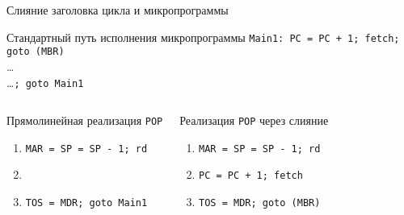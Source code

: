 \begin{frame}{Слияние заголовка цикла и микропрограммы}
\small
\pause
\begin{block}{Стандартный путь исполнения микропрограммы}
\pause
\texttt{Main1: PC = PC + 1; fetch; goto (MBR)}\\
\ldots\\
\ldots\texttt{; goto Main1}
\end{block}
\pause
\begin{columns}
    \column{5.5cm}
    \begin{block}{Прямолинейная реализация \texttt{POP}}
    \pause
    \begin{enumerate}
        \item \texttt{MAR = SP = SP - 1; rd}
        \item \texttt{}
        \item \texttt{TOS = MDR; goto Main1}
    \end{enumerate}
    \end{block}

    \pause
    \column{6cm}
    \begin{block}{Реализация \texttt{POP} через слияние}
    \begin{enumerate}
        \item \texttt{MAR = SP = SP - 1; rd}
        \item \texttt{PC = PC + 1; fetch}
        \item \texttt{TOS = MDR; goto (MBR)}
    \end{enumerate}
    \end{block}
\end{columns}
\end{frame}

